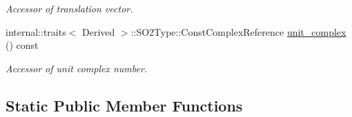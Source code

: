\begin{DoxyCompactItemize}
\begin{DoxyCompactList}\small\item\em Accessor of translation vector. \end{DoxyCompactList}\item 
internal\+::traits$<$ Derived $>$\+::S\+O2\+Type\+::\+Const\+Complex\+Reference \hyperlink{class_sophus_1_1_s_e2_group_base_ace841824d980bbe39f28241df52d646c}{unit\+\_\+complex} () const 
\begin{DoxyCompactList}\small\item\em Accessor of unit complex number. \end{DoxyCompactList}\end{DoxyCompactItemize}
\subsection*{Static Public Member Functions}
